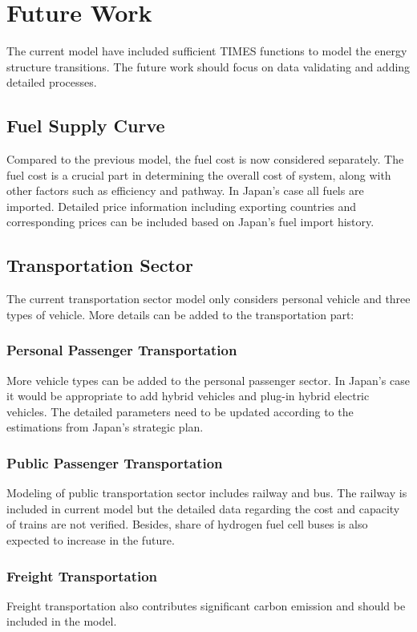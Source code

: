 \documentclass[14pt,a4paper]{article} %
\begin{document}
\section{Future Work}
The current model have included sufficient TIMES functions to model the energy structure transitions. The future work should focus on data validating and adding detailed processes.

\subsection{Fuel Supply Curve}
Compared to the previous model, the fuel cost is now considered separately. The fuel cost is a crucial part in determining the overall cost of system, along with other factors such as efficiency and pathway. In Japan's case all fuels are imported. Detailed price information including exporting countries and corresponding prices can be included based on Japan's fuel import history.

\subsection{Transportation Sector}
The current transportation sector model only considers personal vehicle and three types of vehicle. More details can be added to the transportation part:
\subsubsection{Personal Passenger Transportation}
More vehicle types can be added to the personal passenger sector. In Japan's case it would be appropriate to add hybrid vehicles and plug-in hybrid electric vehicles. The detailed parameters need to be updated according to the estimations from Japan's strategic plan. 
\subsubsection{Public Passenger Transportation}
Modeling of public transportation sector includes railway and bus. The railway is included in current model but the detailed data regarding the cost and capacity of trains are not verified. Besides, share of hydrogen fuel cell buses is also expected to increase in the future\cite{japan_fc_roadmap}.
\subsubsection{Freight Transportation}
Freight transportation also contributes significant carbon emission and should be included in the model.
\end{document}
